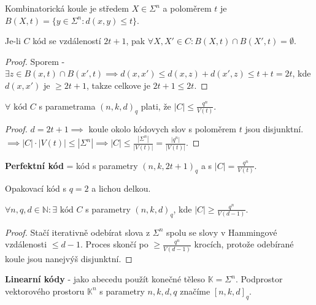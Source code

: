 \begin{definice}
	Kombinatorická koule je středem $X \in \Sigma^n$ a poloměrem $t$ je $B(X,t) = \{y \in \Sigma^n : d(x,y) \leq t\}$.
\end{definice}

\begin{lemma}
	Je-li $C$ kód se vzdáleností $2t+1$, pak $\forall X,X' \in C: B(X,t) \cap B(X',t) = \emptyset$.
\end{lemma}

\begin{proof}
	Sporem - $\exists z \in B(x, t) \cap B(x', t) \implies d(x, x') \leq d(x,z) + d(x', z) \leq t+t = 2t$, kde $d(x, x')$ je $\geq 2t+1$, takze celkove je $2t+1 \leq 2t$.
\end{proof}

\begin{veta}
	$\forall \text{ kód } C$ s parametrama $(n,k,d)_q$ plati, že $|C| \leq \frac{q^n}{V(t)}$.
\end{veta}

\begin{proof}
	$d = 2t +1 \implies$ koule okolo kódovych slov s poloměrem $t$ jsou disjunktní. $\implies |C| \cdot |V(t)| \leq |\Sigma^n| \implies |C| \leq \frac{|\Sigma^n|}{|V(t)|} = \frac{|q^n|}{|V(t)|}$.
\end{proof}

\begin{definice}
	\textbf{Perfektní kód} = kód s parametry $(n,k, 2t+1)_q$ a s $|C| = \frac{q^n}{V(t)}$.
\end{definice}


Opakovací kód s $q=2$ a lichou delkou.

\begin{veta}
	$\forall n,q,d \in \mathbb{N}: \exists \text{ kód } C$ s parametry $(n,k,d)_q$, kde $|C| \geq \frac{q^n}{V(d-1)}$.
\end{veta}

\begin{proof}
	Stačí iterativně odebírat slova z $\Sigma^n$ spolu se slovy v Hammingové vzdálenosti $\leq d-1$. Proces skončí po $\geq \frac{q^n}{V(d-1)}$ krocích, protože odebírané koule jsou nanejvýš disjunktní.
\end{proof}

\begin{definice}
	\textbf{Linearní kódy} - jako abecedu použít konečné těleso $\mathbb{K} = \Sigma^n$. Podprostor vektorového prostoru $\mathbb{K}^n$ s parametry $n,k,d,q$ značíme $[n,k,d]_q$.
\end{definice}


